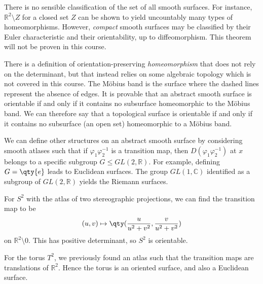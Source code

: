 \begin{remark}
	There is no sensible classification of the set of all smooth surfaces.
	For instance, $\mathbb R^2 \setminus Z$ for a closed set $Z$ can be shown to yield uncountably many types of homeomorphisms.
	However, \textit{compact} smooth surfaces may be classified by their Euler characteristic and their orientability, up to diffeomorphism.
	This theorem will not be proven in this course.

	There is a definition of orientation-preserving \textit{homeomorphism} that does not rely on the determinant, but that instead relies on some algebraic topology which is not covered in this course.
	The M\"obius band is the surface
	where the dashed lines represent the absence of edges.
	It is provable that an abstract smooth surface is orientable if and only if it contains no subsurface homeomorphic to the M\"obius band.
	We can therefore say that a topological surface is orientable if and only if it contains no subsurface (an open set) homeomorphic to a M\"obius band.

	We can define other structures on an abstract smooth surface by considering smooth atlases such that if $\varphi_1 \varphi_2^{-1}$ is a transition map, then $D (\varphi_1 \varphi_2^{-1})$ at $x$ belongs to a specific subgroup $G \leq GL(2, \mathbb R)$.
	For example, defining $G = \qty{e}$ leads to Euclidean surfaces.
	The group $GL(1, \mathbb C)$ identified as a subgroup of $GL(2, \mathbb R)$ yields the Riemann surfaces.
\end{remark}
\begin{example}
	For $S^2$ with the atlas of two stereographic projections, we can find the transition map to be
	\begin{align*}
		(u,v) \mapsto \qty(\frac{u}{u^2 + v^2}, \frac{v}{u^2 + v^2})
	\end{align*}
	on $\mathbb R^2 \setminus \qty{0}$.
	This has positive determinant, so $S^2$ is orientable.

	For the torus $T^2$, we previously found an atlas such that the transition maps are translations of $\mathbb R^2$.
	Hence the torus is an oriented surface, and also a Euclidean surface.
\end{example}

